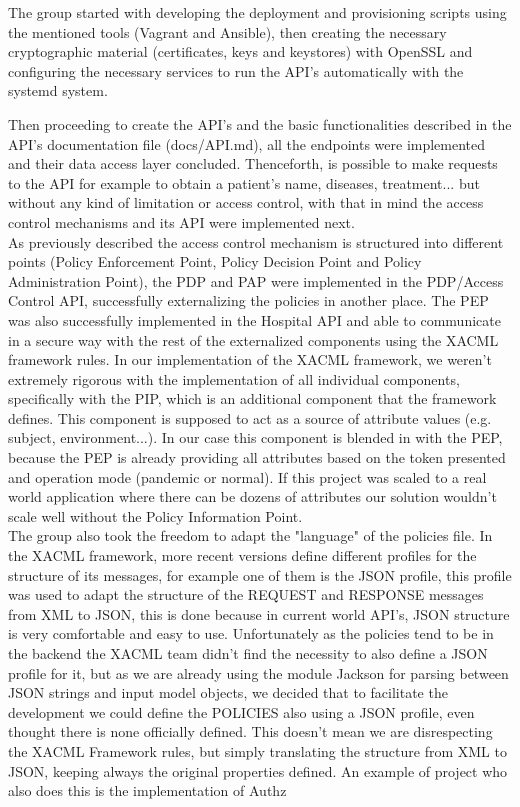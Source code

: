 The group started with developing the deployment and provisioning scripts using the mentioned tools (Vagrant and Ansible), then creating the necessary cryptographic material (certificates, keys and keystores) with OpenSSL and configuring the necessary services to run the API's automatically with the systemd system.

Then proceeding to create the API's and the basic functionalities described in the API's documentation file (docs/API.md), all the endpoints were implemented and their data access layer concluded. Thenceforth, is possible to make requests to the API for example to obtain a patient's name, diseases, treatment... but without any kind of limitation or access control, with that in mind the access control mechanisms and its API were implemented next. \\

As previously described the access control mechanism is structured into different points (Policy Enforcement Point, Policy Decision Point and Policy Administration Point), the PDP and PAP were implemented in the PDP/Access Control API, successfully externalizing the policies in another place. The PEP was also successfully implemented in the Hospital API and able to communicate in a secure way with the rest of the externalized components using the XACML framework rules. In our implementation of the XACML framework, we weren't extremely rigorous with the implementation of all individual components, specifically with the PIP, which is an additional component that the framework defines. This component is supposed to act as a source of attribute values (e.g. subject, environment...). In our case this component is blended in with the PEP, because the PEP is already providing all attributes based on the token presented and operation mode (pandemic or normal). If this project was scaled to a real world application where there can be dozens of attributes our solution wouldn't scale well without the Policy Information Point. \\

The group also took the freedom to adapt the "language" of the policies file. In the XACML framework, more recent versions define different profiles for the structure of its messages, for example one of them is the JSON profile, this profile was used to adapt the structure of the REQUEST and RESPONSE messages from XML to JSON, this is done because in current world API's, JSON structure is very comfortable and easy to use. Unfortunately as the policies tend to be in the backend the XACML team didn't find the necessity to also define a JSON profile for it, but as we are already using the module Jackson \cite{jackson} for parsing between JSON strings and input model objects, we decided that to facilitate the development we could define the POLICIES also using a JSON profile, even thought there is none officially defined. This doesn't mean we are disrespecting the XACML Framework rules, but simply translating the structure from XML to JSON, keeping always the original properties defined. An example of project who also does this is the implementation of Authz \cite{authz} \\

